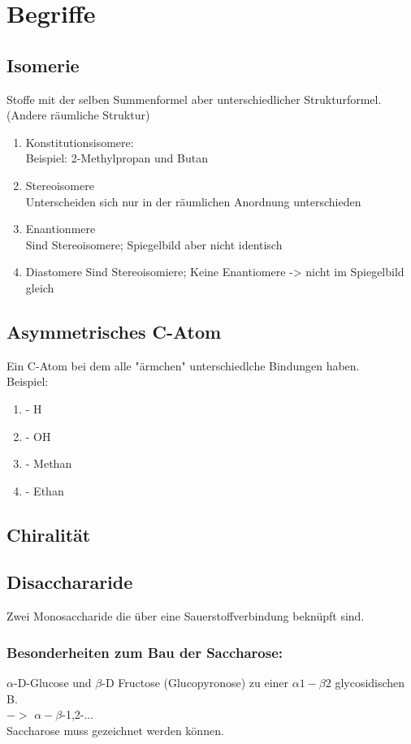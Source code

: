 
\section{Begriffe} \label{sec:begriffe}
\subsection{Isomerie}
Stoffe mit der selben Summenformel aber unterschiedlicher Strukturformel. (Andere räumliche Struktur)
\begin{enumerate}
    \item Konstitutionsisomere: \\
        Beispiel: 2-Methylpropan und Butan

    \item Stereoisomere \\
        Unterscheiden sich nur in der räumlichen Anordnung unterschieden
    \item Enantionmere \\
        Sind Stereoisomere; Spiegelbild aber nicht identisch
    \item Diastomere
        Sind Stereoisomiere; Keine Enantiomere -> nicht im Spiegelbild gleich

\end{enumerate}
\subsection{Asymmetrisches C-Atom}
Ein C-Atom bei dem alle "ärmchen" unterschiedlche Bindungen haben. \\
Beispiel:
\begin{enumerate}
    \item - H
    \item - OH
    \item - Methan
    \item - Ethan
\end{enumerate}

\subsection{Chiralität}


\subsection{Disacchararide}
Zwei Monosaccharide die über eine Sauerstoffverbindung beknüpft sind.
\subsubsection{Besonderheiten zum Bau der Saccharose:}
$\alpha$-D-Glucose und $\beta$-D Fructose (Glucopyronose) zu einer $\alpha 1 -\beta 2$ glycosidischen B. \\ $->$ $\alpha-\beta$-1,2-... \\
Saccharose muss gezeichnet werden können.

